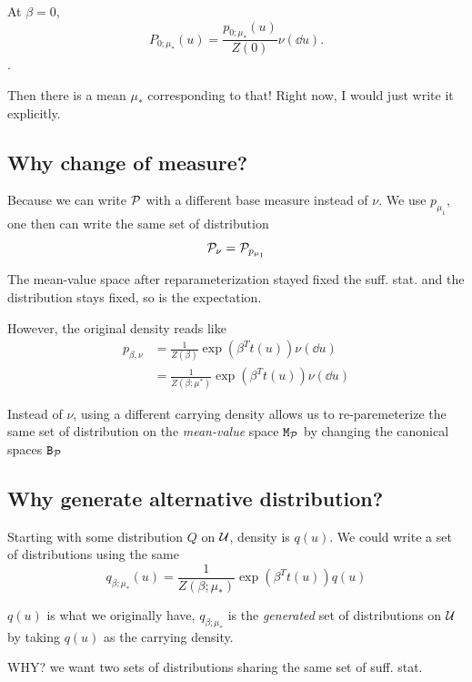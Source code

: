 At $\beta=0$,
\begin{equation*}
	P_{0;\mu_*}(u) = \frac{p_{0;\mu_*}(u)}{Z(0)} \nu(\dd{u}).
\end{equation*}.

Then there is a mean $\mu_*$ corresponding to that!
Right now, I would just write it explicitly.

\subsection{Why change of measure?}

Because we can write $\mathcal{P}$ with a different base measure instead of $\nu$.
We use $p_{\mu_1}$, one then can write the same set of distribution
\begin{equation*}
	\Pc_{\nu} = \Pc_{p_{\mu_1}}
\end{equation*}

The mean-value space after reparameterization stayed fixed
the suff. stat. and the distribution stays fixed, so is the expectation.

However, the original density reads like
\begin{align*}
	p_{\beta,\nu} &= \frac{1}{Z(\beta)} \exp\left(\beta^T t(u)\right) \nu(\dd{u}) \\
	&= \frac{1}{Z(\beta;\mu^*)} \exp\left(\beta^T t(u)\right) \nu(\dd{u})
\end{align*}

Instead of $\nu$, using a different carrying density allows us to re-paremeterize the
same set of distribution on the \emph{mean-value} space $\mathtt{M}_{\mathcal{P}}$ 
by changing the canonical spaces $\mathtt{B}_{\mathcal{P}}$

\subsection{Why generate alternative distribution?}

Starting with some distribution $Q$ on $\mathcal{U}$, density is $q(u)$.
We could write a set of distributions using the same
\begin{equation*}
	q_{\beta;\mu_*}(u) = \frac{1}{Z(\beta;\mu_*)} \exp(\beta^T t(u)) q(u)
\end{equation*}

$q(u)$ is what we originally have, $q_{\beta;\mu_*}$ is the \emph{generated} set of 
distributions on $\mathcal{U}$ by taking $q(u)$ as the carrying density.

WHY? we want two sets of distributions sharing the same set of suff. stat.

